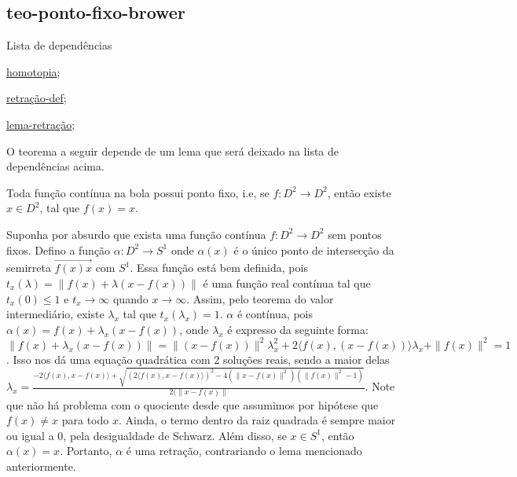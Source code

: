 \subsection{teo-ponto-fixo-brower} %
\label{teo-ponto-fixo-brower}
\begin{titlemize}{Lista de dependências}
	\item \hyperref[homotopia]{homotopia};\\ %
	\item \hyperref[retração-def]{retração-def};\\
    \item \hyperref[lema-retração]{lema-retração};\\
\end{titlemize}
O teorema a seguir depende de um lema que será deixado na lista de dependências acima.
\begin{thm}[Teorema do Ponto Fixo de Brower]%
	Toda função contínua na bola possui ponto fixo, i.e, se $f:D^2 \longrightarrow D^2$, então existe $x \in D^2$, tal que $f(x) = x$.
\end{thm}

\begin{dem}
    Suponha por absurdo que exista uma função contínua $f:D^2 \longrightarrow D^2$ sem pontos fixos. Defino a função $\alpha: D^2 \longrightarrow S^1$ onde $\alpha(x)$ é o único ponto de intersecção da semirreta $\overrightarrow{f(x)x}$ com $S^1$. Essa função está bem definida, pois $t_x(\lambda) = \|f(x) + \lambda(x - f(x))\|$ é uma função real contínua tal que $t_x(0) \leq 1$ e $t_x \to \infty$ quando $x \to \infty$. Assim, pelo teorema do valor intermediário, existe $\lambda_x$ tal que $t_x(\lambda_x) = 1$. $\alpha$ é contínua, pois $\alpha(x) = f(x) + \lambda_x(x - f(x))$, onde $\lambda_x$ é expresso da seguinte forma:
    $\|f(x) + \lambda_x(x - f(x))\| = \|(x - f(x))\|^2\lambda_x^2 + 2\langle f(x), (x - f(x)) \rangle\lambda_x + \|f(x)\|^2 = 1$. Isso nos dá uma equação quadrática com 2 soluções reais, sendo a maior delas $\lambda_x = \frac{-2\langle f(x), x - f(x)\rangle + \sqrt{(2\langle f(x), x - f(x)\rangle)^2 - 4(\|x - f(x)\|^2)(\|f(x)\|^2 - 1)}}{2(\|x - f(x)\|}$. Note que não há problema com o quociente desde que assumimos por hipótese que $f(x) \ne x$ para todo $x$. Ainda, o termo dentro da raiz quadrada é sempre maior ou igual a 0, pela desigualdade de Schwarz. Além disso, se $x \in S^1$, então $\alpha(x) = x$. Portanto, $\alpha$ é uma retração, contrariando o lema mencionado anteriormente.

\end{dem}

